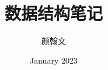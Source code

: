 \documentclass[a4paper,12pt]{ctexbook}
\begin{document}
\author{颜翰文}
\title{\heiti\Huge 数据结构笔记}
\date{January 2023}

\frontmatter
\maketitle
\tableofcontents

\mainmatter





\backmatter
\end{document}
